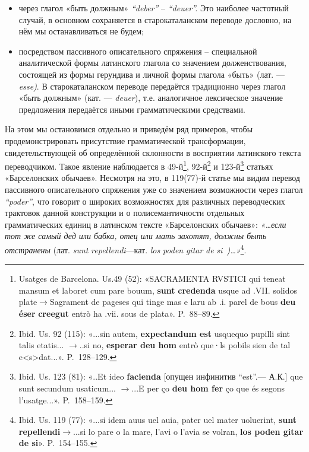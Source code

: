 \begin{itemize}
\item через глагол «быть должным» \emph{“}\emph{deber}\emph{”} --\emph{ “}\emph{deuer}\emph{”. }Это наиболее частотный случай, в основном сохраняется в старокаталанском переводе дословно, на нём мы останавливаться не будем;
\item посредством пассивного описательного спряжения -- специальной аналитической формы латинского глагола со значением долженствования, состоящей из формы герундива и личной формы глагола «быть»\emph{ }(лат. ---\emph{ }\emph{esse}\emph{)}. В старокаталанском переводе передаётся традиционно через глагол «быть должным» (кат. --- \emph{deuer}), т.е. аналогичное лексическое значение предложения передаётся иными грамматическими средствами.
\end{itemize}
На этом мы остановимся отдельно и приведём ряд примеров, чтобы продемонстрировать присутствие грамматической трансформации, свидетельствующей об определённой склонности в восприятии латинского текста переводчиком. Такое явление наблюдается в 49-й\footnote{Usatges de Barcelona. Us.49 (52): «SACRAMENTA RVSTICI qui teneat mansum et laboret cum pare bouum, \textbf{sunt}\textbf{ }\textbf{credenda} usque ad .VII. solidos plate$\rightarrow$Sagrament de pageses qui tinge mas e laru ab .i. parel de bous \textbf{deu}\textbf{ é}\textbf{ser}\textbf{ }\textbf{creegut}\textbf{ }entrò ha .vii. sous de plata». P.~88--89.}, 92-й\footnote{Ibid. Us. 92 (115): «...sin autem, \textbf{expectandum est }usquequo pupilli sint talis etatis... $\rightarrow$..si no, \textbf{esperar deu hom} entrò que·ls pobils sien de tal e<s>dat...». P.~128--129.} и 123-й\footnote{Ibid. Us. 123 (81): «..Et ideo \textbf{facienda} [опущен инфинитив “est”.--- А.К.] que sunt secundum usaticum... $\rightarrow$...E per ço \textbf{deu hom fer} ço que és segons l’usatge...». P.~158--159.} статьях «Барселонских обычаев». Несмотря на это, в 119(77)-й статье мы видим перевод пассивного описательного спряжения уже со значением возможности через глагол \emph{“po}\emph{der}\emph{”}, что говорит о широких возможностях для различных переводческих трактовок данной конструкции и о полисемантичности отдельных грамматических единиц в латинском тексте «Барселонских обычаев»: \emph{«…если тот же самый дед или бабка, отец или мать захотят, должны быть отстранены }(лат. \emph{sunt}\emph{ }\emph{repellendi}---кат.\emph{ }\emph{los}\emph{ }\emph{poden}\emph{ }\emph{gitar}\emph{ }\emph{de}\emph{ }\emph{si}\emph{~}\emph{)…»}\footnote{Ibid. Us. 119 (77): «...si idem auus uel auia, pater uel mater uoluerint, \textbf{sunt repellendi}$\rightarrow$...si lo pare o la mare, l’avi o l'avia se volran, \textbf{los poden gitar de si}». P.~154--155.}.\textsuperscript{ }

